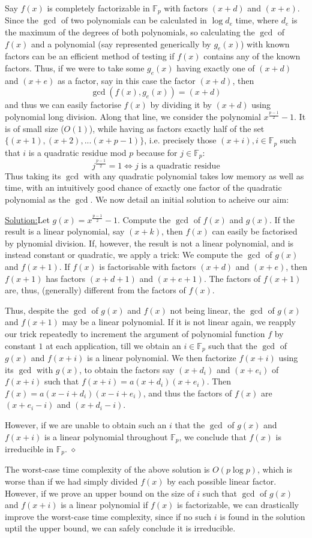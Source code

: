 \documentclass{report}
\newenvironment{aimsol}[1]{\vspace{2.5mm}\par\noindent\underline{Solution:}\space#1}{\hfill $\diamond$ \vspace{2.5mm} \par}
\begin{document}
Say $f(x)$ is completely factorizable in $\mathbb{F}_p$ with factors $(x+d)$ and $(x+e)$. Since the $\gcd$ of two polynomials can be calculated in $\log d_e$ time, where $d_e$ is the maximum of the degrees of both polynomials, so calculating the $\gcd$ of $f(x)$ and a polynomial (say represented generically by $g_e(x)$) with known factors can be an efficient method of testing if $f(x)$ contains any of the known factors. Thus, if we were to take some $g_e(x)$ having exactly one of $(x+d)$ and $(x+e)$ as a factor, say in this case the factor $(x+d)$, then
\[\gcd(f(x),g_e(x))=(x+d)\]
and thus we can easily factorise $f(x)$ by dividing it by $(x+d)$ using polynomial long division. Along that line, we consider the polynomial $x^{\frac{p-1}{2}}-1$. It is of small size ($O(1)$), while having as factors exactly half of the set $\{(x+1),(x+2),...(x+p-1)\}$, i.e. precisely those $(x+i), i\in \mathbb{F}_p$ such that $i$ is a quadratic residue mod $p$ because for $j\in\mathbb{F}_p$:
$$j^{\frac{p-1}{2}}=1 \Leftrightarrow j\text{ is a quadratic residue}$$
Thus taking its $\gcd$ with any quadratic polynomial takes low memory as well as time, with an intuitively good chance of exactly one factor of the quadratic polynomial as the $\gcd$. We now detail an initial solution to acheive our aim:
\begin{aimsol}
Let $g(x)=x^{\frac{p-1}{2}}-1$. Compute the $\gcd$ of $f(x)$ and $g(x)$. If the result is a linear polynomial, say $(x+k)$, then $f(x)$ can easily be factorised by plynomial division. If, however, the result is not a linear polynomial, and is instead constant or quadratic, we apply a trick: We compute the $\gcd$ of $g(x)$ and $f(x+1)$. If $f(x)$ is factorisable with factors $(x+d)$ and $(x+e)$, then $f(x+1)$ has factors $(x+d+1)$ and $(x+e+1)$. The factors of $f(x+1)$ are, thus, (generally) different from the factors of $f(x)$.

Thus, despite the $\gcd$ of $g(x)$ and $f(x)$ not being linear, the $\gcd$ of $g(x)$ and $f(x+1)$ may be a linear polynomial. If it is not linear again, we reapply our trick repeatedly to increment the argument of polynomial function $f$ by constant $1$ at each application, till we obtain an $i\in\mathbb{F}_p$ such that the $\gcd$ of $g(x)$ and $f(x+i)$ is a linear polynomial. We then factorize $f(x+i)$ using its $\gcd$ with $g(x)$, to obtain the factors say $(x+d_i)$ and $(x+e_i)$ of $f(x+i)$ such that $f(x+i)=a(x+d_i)(x+e_i)$. Then $f(x)=a(x-i+d_i)(x-i+e_i)$, and thus the factors of $f(x)$ are $(x+e_i-i)$ and $(x+d_i-i)$.

However, if we are unable to obtain such an $i$ that the $\gcd$ of $g(x)$ and $f(x+i)$ is a linear polynomial throughout $\mathbb{F}_p$, we conclude that $f(x)$ is irreducible in $\mathbb{F}_p$.
\end{aimsol}
%
The worst-case time complexity of the above solution is $O(p\log p)$, which is worse than if we had simply divided $f(x)$ by each possible linear factor. However, if we prove an upper bound on the size of $i$ such that $\gcd$ of $g(x)$ and $f(x+i)$ is a linear polynomial if $f(x)$ is factorizable, we can drastically improve the worst-case time complexity, since if no such $i$ is found in the solution uptil the upper bound, we can safely conclude it is irreducible.
\end{document}
